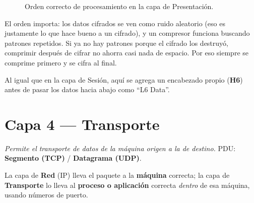 \documentclass[11pt,a4paper]{article}
\begin{document}
\begin{figure}[h]
\centering
{}
\caption{Orden correcto de procesamiento en la capa de Presentación.}
\end{figure}

\begin{examfact}
El orden importa: los datos cifrados se ven como ruido aleatorio (eso es justamente lo que hace bueno a un cifrado), y un compresor funciona buscando patrones repetidos. Si ya no hay patrones porque el cifrado los destruyó, comprimir después de cifrar no ahorra casi nada de espacio. Por eso siempre se comprime primero y se cifra al final.
\end{examfact}

Al igual que en la capa de Sesión, aquí se agrega un encabezado propio (\textbf{H6}) antes de pasar los datos hacia abajo como ``L6 Data''.

\newpage
\section{Capa 4 --- Transporte}
\textit{Permite el transporte de datos de la máquina origen a la de destino.} PDU: \textbf{Segmento (TCP)} / \textbf{Datagrama (UDP)}.

\begin{examfact}
La capa de \textbf{Red} (IP) lleva el paquete a la \textbf{máquina} correcta; la capa de \textbf{Transporte} lo lleva al \textbf{proceso o aplicación} correcta \emph{dentro} de esa máquina, usando números de puerto.
\end{examfact}
\end{document}
